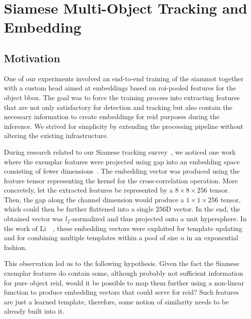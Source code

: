 \section{Siamese Multi-Object Tracking and Embedding}
\label{sec:SiamMOTandFeatureEmb}

\subsection{Motivation}

One of our experiments involved an end-to-end training of the \gls{siammot} together with a custom head aimed at embeddings based on \gls{roi}-pooled features for the object \gls{bbox}. The goal was to force the training process into extracting features that are not only satisfactory for detection and tracking but also contain the necessary information to create embeddings for \gls{reid} purposes during the inference. We strived for simplicity by extending the processing pipeline without altering the existing infrastructure.

During research related to our Siamese tracking survey~\cite{ondrasovic2021siamese}, we noticed one work where the exemplar features were projected using \gls{gap} into an embedding space consisting of fewer dimensions~\cite{li2020figsiam}. The embedding vector was produced using the feature tensor representing the kernel for the cross-correlation operation. More concretely, let the extracted features be represented by a $8 \times 8 \times 256$ tensor. Then, the \gls{gap} along the channel dimension would produce a $1 \times 1 \times 256$ tensor, which could then be further flattened into a single $256$D vector. In the end, the obtained vector was $l_2$-normalized and thus projected onto a unit hypersphere. In the work of Li~\etal{}~\cite{li2020figsiam}, these embedding vectors were exploited for template updating and for combining multiple templates within a pool of size $n$ in an exponential fashion.

This observation led us to the following hypothesis. Given the fact the Siamese exemplar features do contain some, although probably not sufficient information for pure object \gls{reid}, would it be possible to map them further using a non-linear function to produce embedding vectors that could serve for \gls{reid}? Such features are just a learned template, therefore, some notion of similarity needs to be already built into it.

